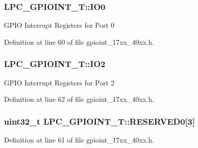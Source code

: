 \subsubsection[{\texorpdfstring{I\+O0}{IO0}}]{ L\+P\+C\+\_\+\+G\+P\+I\+O\+I\+N\+T\+\_\+\+T\+::\+I\+O0}\hypertarget{structLPC__GPIOINT__T_a4edac525fb01aae7b57c4bcc9563ae27}{}\label{structLPC__GPIOINT__T_a4edac525fb01aae7b57c4bcc9563ae27}
G\+P\+IO Interrupt Registers for Port 0 

Definition at line 60 of file gpioint\+\_\+17xx\+\_\+40xx.\+h.

\subsubsection[{\texorpdfstring{I\+O2}{IO2}}]{ L\+P\+C\+\_\+\+G\+P\+I\+O\+I\+N\+T\+\_\+\+T\+::\+I\+O2}\hypertarget{structLPC__GPIOINT__T_a1300843bc75ee56c6177f05f69b23ef8}{}\label{structLPC__GPIOINT__T_a1300843bc75ee56c6177f05f69b23ef8}
G\+P\+IO Interrupt Registers for Port 2 

Definition at line 62 of file gpioint\+\_\+17xx\+\_\+40xx.\+h.

\subsubsection[{\texorpdfstring{R\+E\+S\+E\+R\+V\+E\+D0}{RESERVED0}}]{\setlength{\rightskip}{0pt plus 5cm}uint32\+\_\+t L\+P\+C\+\_\+\+G\+P\+I\+O\+I\+N\+T\+\_\+\+T\+::\+R\+E\+S\+E\+R\+V\+E\+D0\mbox{[}3\mbox{]}}\hypertarget{structLPC__GPIOINT__T_a6afff78f3399fec13a72b78999cc6b80}{}\label{structLPC__GPIOINT__T_a6afff78f3399fec13a72b78999cc6b80}


Definition at line 61 of file gpioint\+\_\+17xx\+\_\+40xx.\+h.

